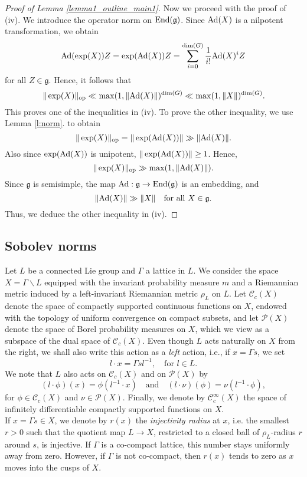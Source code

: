 \documentclass[11pt,reqno,a4paper]{amsart}
\numberwithin{equation}{section}
\newcommand{\cC}{\mathcal{C}}
\newcommand{\cP}{\mathcal{P}}
\newcommand{\gog}{\mathfrak{g}}
\newcommand{\ra}{\rightarrow}
\newcommand{\qand}{\quad \textrm{and} \quad}
\DeclareMathOperator{\Ad}{Ad}
\theoremstyle{theorem}
\theoremstyle{definition}
\begin{document}
\begin{proof}[Proof of Lemma \ref{lemma1_outline_main1}]
Now we proceed with the proof of (iv).
We introduce the operator norm on $\hbox{End}(\gog)$.
Since $\hbox{Ad}(X)$ is a nilpotent transformation, we obtain
\begin{equation}
\label{eq:ad}
\hbox{Ad}(\exp(X))Z=\exp(\hbox{Ad}(X))Z=\sum_{i=0}^{\dim(G)} \frac{1}{i!}\hbox{Ad}(X)^i Z
\end{equation}
for all $Z\in \gog$.
Hence, it follows that
$$
\|\exp(X)\|_{\rm op}\ll \max (1,\|\hbox{Ad}(X)\|)^{\dim(G)}
\ll \max(1,\|X\|)^{\dim(G)}.
$$
This proves one of the inequalities in (iv).
To prove the other inequality, we use Lemma \ref{l:norm}.
to obtain
$$
\|\exp(X)\|_{\rm op}=\|\exp(\hbox{Ad}(X))\|\gg \|\hbox{Ad}(X)\|.
$$
Also since $\exp(\hbox{Ad}(X))$ is unipotent, $\|\exp(\hbox{Ad}(X))\|\ge 1$.
Hence,
$$
\|\exp(X)\|_{\rm op}\gg \max(1,\|\hbox{Ad}(X)\|).
$$
Since $\gog$ is semisimple, the map $\Ad:\mathfrak{g}\to \hbox{End}(\mathfrak{g})$ is an embedding, and 
$$
\|\hbox{Ad}(X)\|\gg \|X\|\quad\hbox{for all $X\in\gog$.}
$$
Thus, we deduce the other inequality in (iv). 
\end{proof}



\subsection{Sobolev norms}\label{sec:sobolev}

Let $L$  be a connected Lie group and 
$\Gamma$ a lattice in  $L$. 
We consider the space $X = \Gamma \backslash L$  
equipped with the invariant probability measure $m$
and a Riemannian metric induced by a left-invariant Riemannian metric $\rho_L$ on $L$.
Let $\cC_c(X)$ denote the space of compactly 
supported continuous functions on $X$, endowed with the topology of uniform convergence on
compact subsets, and let $\cP(X)$ denote the space of Borel probability measures on $X$, which we view as a 
subspace of the dual space of $\cC_c(X)$. Even though $L$ acts naturally on $X$ from the right, we shall also 
write this action as a \emph{left} action, i.e., if $x = \Gamma s$, we set
\[
l\cdot x = \Gamma s l^{-1}, \quad \textrm{for $l \in L$}.
\]
We note that $L$ also acts on $\cC_c(X)$ and on $\cP(X)$ by
\[
(l \cdot \phi)(x) = \phi(l^{-1} \cdot x) \qand (l \cdot \nu)(\phi) = \nu(l^{-1} \cdot \phi),
\]
for $\phi \in\cC_c(X)$ and $\nu \in \cP(X)$. Finally, we denote by $\cC_c^\infty(X)$ the space of infinitely differentiable
compactly supported functions on $X$. \\

If $x = \Gamma s \in X$, we denote by $r(x)$ the 
\emph{injectivity radius} at $x$, i.e. the smallest $r > 0$ such that the quotient map $L \ra X$, restricted to 
a closed ball of $\rho_L$-radius $r$ around $s$, is injective. If $\Gamma$ is a co-compact lattice, this 
number stays uniformly away from zero. However, if $\Gamma$ is not co-compact, then $r(x)$ 
tends to zero as $x$ moves into the cusps of $X$. \\
\end{document}
